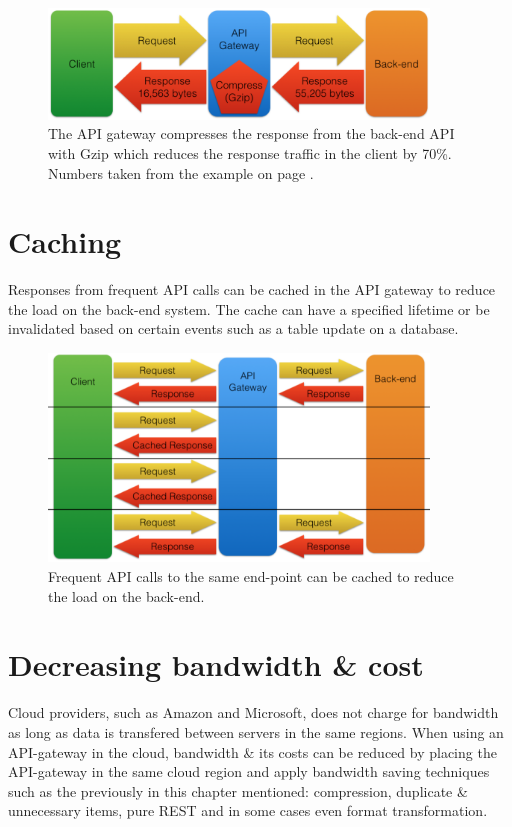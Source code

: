 \documentclass{cslthse-msc}
\begin{document}
\begin{figure}[H]
  \centering
    \begin{center}
      \includegraphics[width=0.9\textwidth]{images/api_gateway_compression.png}
    \end{center}
  \caption{The API gateway compresses the response from the back-end API with Gzip which reduces the response traffic in the client by 70\%. Numbers taken from the example on page \pageref{compression}.}
\end{figure}

\section{Caching}
Responses from frequent API calls can be cached in the API gateway to reduce the load on the back-end system\cite[page 107]{AASG}. The cache can have a specified lifetime or be invalidated based on certain events such as a table update on a database.

\begin{figure}[H]
  \centering
    \begin{center}
      \includegraphics[width=0.9\textwidth]{images/api_gateway_cache.png}
    \end{center}
  \caption{Frequent API calls to the same end-point can be cached to reduce the load on the back-end.}
\end{figure}

\section{Decreasing bandwidth \& cost}
Cloud providers, such as Amazon\cite{cloud_amazon} and Microsoft\cite{cloud_microsoft}, does not charge for bandwidth as long as data is transfered between servers in the same regions. When using an API-gateway in the cloud, bandwidth \& its costs can be reduced by placing the API-gateway in the same cloud region and apply bandwidth saving techniques such as the previously in this chapter mentioned: compression, duplicate \& unnecessary items, pure REST and in some cases even format transformation.
\end{document}
